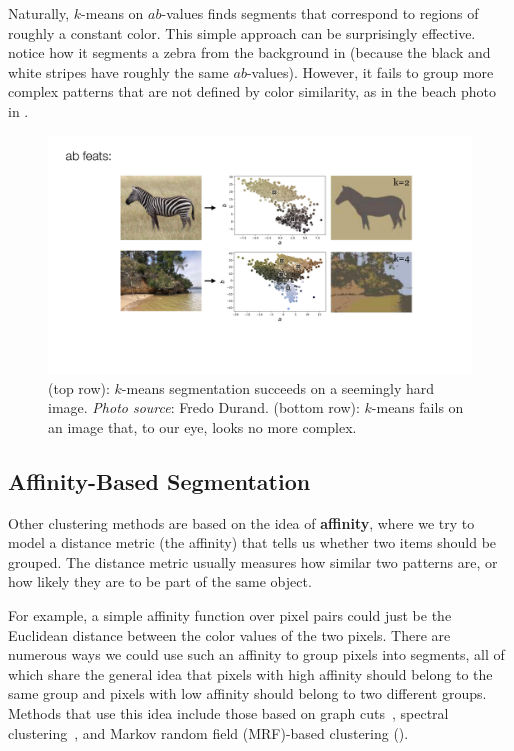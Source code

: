 Naturally, $k$-means on $ab$-values finds segments that correspond to regions of roughly a constant color. This simple approach can be surprisingly effective. notice how it segments a zebra from the background in \fig{\ref{fig:perceptual_organization:kmeans_ab_zebra_and_beach}} (because the black and white stripes have roughly the same $ab$-values). However, it fails to group more complex patterns that are not defined by color similarity, as in the beach photo in \fig{\ref{fig:perceptual_organization:kmeans_ab_zebra_and_beach}}.
\begin{figure}[h!]
    \centerline{
        \includegraphics[width=1.0\linewidth]{./figures/perceptual_organization/kmeans_ab_zebra_and_beach.pdf}
    }
    \caption{(top row): $k$-means segmentation succeeds on a seemingly hard image. \textit{Photo source}: Fredo Durand. (bottom row): $k$-means fails on an image that, to our eye, looks no more complex.}
    \label{fig:perceptual_organization:kmeans_ab_zebra_and_beach}
\end{figure}
\vspace{-0.4cm}

\subsection{Affinity-Based Segmentation}\label{sec:perceptual_organization:affinity_based_segmentation}
Other clustering methods are based on the idea of \textbf{affinity}, where we try to model a distance metric (the affinity) that tells us whether two items should be grouped. The distance metric usually measures how similar two patterns are, or how likely they are to be part of the same object.

For example, a simple affinity function over pixel pairs could just be the Euclidean distance between the color values of the two pixels. There are numerous ways we could use such an affinity to group pixels into segments, all of which share the general idea that pixels with high affinity should belong to the same group and pixels with low affinity should belong to two different groups. Methods that use this idea include those based on graph cuts~\cite{shi2000normalized}, spectral clustering~\cite{arbelaez2010contour}, and Markov random field (MRF)-based clustering (\chap{\ref{chapter:probabilistic_graphical_models}}).

